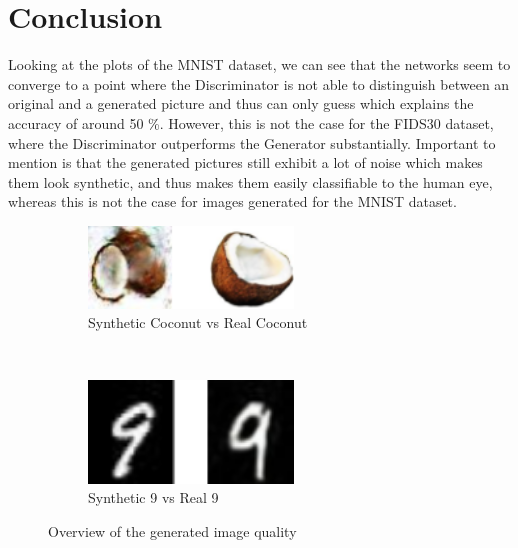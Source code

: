 \documentclass[13pt]{article}
\begin{document}



\section{Conclusion}

Looking at the plots of the MNIST dataset, we can see that the networks seem to converge to a point where the Discriminator is not able to distinguish between an original and a generated picture and thus can only guess which explains the accuracy of around 50 \%. However, this is not the case for the FIDS30 dataset, where the Discriminator outperforms the Generator substantially. Important to mention is that the generated pictures still exhibit a lot of noise which makes them look synthetic, and thus makes them easily
classifiable to the human eye, whereas this is not the case for images generated for the MNIST dataset.

\begin{figure}[h!]
    \centering
    \begin{subfigure}[c]{0.48\textwidth}
    \centering
        \includegraphics[width=0.6\textwidth]{plots/comparison_fruits.png}
        \caption{Synthetic Coconut vs Real Coconut}
    \end{subfigure}
    ~ 
    \begin{subfigure}[c]{0.48\textwidth}
    \centering
        \includegraphics[width=0.6\textwidth]{plots/comparison_mnist.png}
        \caption{Synthetic 9 vs Real 9}
    \end{subfigure}
    \caption{Overview of the generated image quality}
    \label{fig:quality}
\end{figure}
\end{document}
